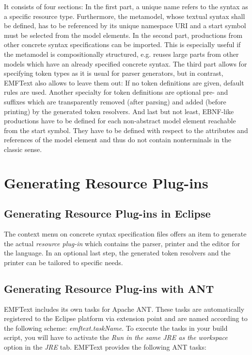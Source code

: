 It consists of four sections: In the first part, a unique
name refers to the syntax as a specific resource type. Furthermore, the metamodel, 
whose textual syntax shall be defined, has 
to be referenced by its  unique namespace URI and a start symbol must be selected from 
the model elements. In the second part, productions from other concrete syntax 
specifications can be imported. This is especially useful if the metamodel is 
compositionally structured, e.g. reuses large parts from other models which have an 
already specified concrete syntax.  The third part allows for specifying token types as
 it is usual for parser generators, but in contrast, EMFText also allows to leave them 
 out: If no token definitions are given, default rules are used. Another specialty for 
 token definitions are optional pre- and suffixes which are transparently removed (after 
 parsing) and added (before printing) by the generated token resolvers. And last but 
 not least, EBNF-like productions have to be defined for each non-abstract model element 
 reachable from the start symbol. They have to be defined with respect to the attributes 
 and references of the model element and thus do not contain nonterminals in the classic 
 sense.

\section{Generating Resource Plug-ins}
\label{sec:process_generating}

\subsection{Generating Resource Plug-ins in Eclipse}

The context menu on concrete syntax specification files offers an item to generate the 
actual \emph{resource plug-in} which contains the parser, printer and the editor
for the language. In an optional last step, the generated token resolvers and the printer 
can be tailored to specific needs.

\subsection{Generating Resource Plug-ins with ANT}
\label{sec:process_generating_ant}
EMFText includes its own tasks for Apache ANT. These tasks are automatically registered 
to the Eclipse platform via extension point and are named according to the following 
scheme: \emph{emftext.taskName}. To execute the tasks in your build script, you will
have to activate the \emph{Run in the same JRE as the workspace} option in the \emph{JRE}
tab. EMFText provides the following ANT tasks:
